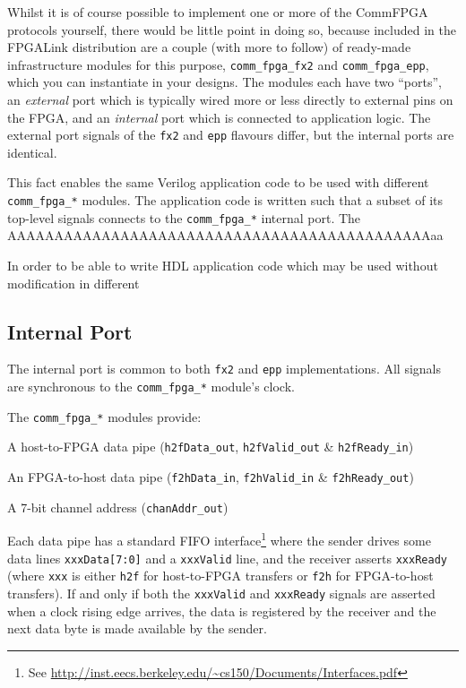 Whilst it is of course possible to implement one or more of the CommFPGA protocols yourself, there would be little point in doing so, because included in the FPGALink distribution are a couple (with more to follow) of ready-made infrastructure modules for this purpose, \texttt{comm\_fpga\_fx2} and \texttt{comm\_fpga\_epp}, which you can instantiate in your designs. The modules each have two ``ports'', an \textit{external} port which is typically wired more or less directly to external pins on the FPGA, and an \textit{internal} port which is connected to application logic. The external port signals of the \texttt{fx2} and \texttt{epp} flavours differ, but the internal ports are identical.


This fact enables the same Verilog application code to be used with different \texttt{comm\_fpga\_*} modules. The application code is written such that a subset of its top-level signals connects to the \texttt{comm\_fpga\_*} internal port. The AAAAAAAAAAAAAAAAAAAAAAAAAAAAAAAAAAAAAAAAAAAAAaa


In order to be able to write HDL application code which may be used without modification in different 

\subsection{Internal Port}
The internal port is common to both \texttt{fx2} and \texttt{epp} implementations. All signals are synchronous to the \texttt{comm\_fpga\_*} module's clock.


The \texttt{comm\_fpga\_*} modules provide:

\begin{blobs}
  \item A host-to-FPGA data pipe (\texttt{h2fData\_out}, \texttt{h2fValid\_out} \& \texttt{h2fReady\_in})
  \item An FPGA-to-host data pipe (\texttt{f2hData\_in}, \texttt{f2hValid\_in} \& \texttt{f2hReady\_out})
  \item A 7-bit channel address (\texttt{chanAddr\_out})
\end{blobs}

Each data pipe has a standard FIFO interface\footnote{See \url{http://inst.eecs.berkeley.edu/~cs150/Documents/Interfaces.pdf}} where the sender drives some data lines \texttt{xxxData[7:0]} and a \texttt{xxxValid} line, and the receiver asserts \texttt{xxxReady} (where \texttt{xxx} is either \texttt{h2f} for host-to-FPGA transfers or \texttt{f2h} for FPGA-to-host transfers). If and only if both the \texttt{xxxValid} and \texttt{xxxReady} signals are asserted when a clock rising edge arrives, the data is registered by the receiver and the next data byte is made available by the sender.

